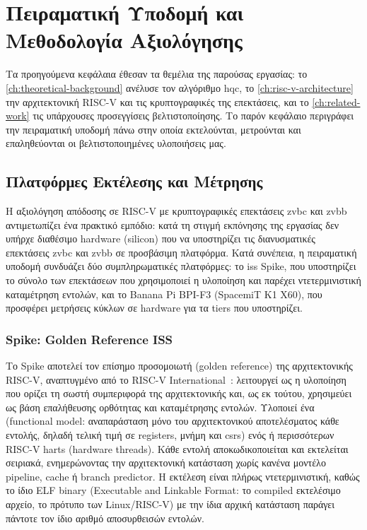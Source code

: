 \chapter{Πειραματική Υποδομή και Μεθοδολογία Αξιολόγησης}
\label{ch:experimental-setup}

Τα προηγούμενα κεφάλαια έθεσαν τα θεμέλια της παρούσας εργασίας: το
\cref{ch:theoretical-background} ανέλυσε τον αλγόριθμο \gls{hqc}, το
\cref{ch:risc-v-architecture} την αρχιτεκτονική RISC-V και τις κρυπτογραφικές
της επεκτάσεις, και το \cref{ch:related-work} τις υπάρχουσες προσεγγίσεις
βελτιστοποίησης. Το παρόν κεφάλαιο περιγράφει την πειραματική υποδομή πάνω στην
οποία εκτελούνται, μετρούνται και επαληθεύονται οι βελτιστοποιημένες υλοποιήσεις μας.

\section{Πλατφόρμες Εκτέλεσης και Μέτρησης}
\label{sec:emulators}

Η αξιολόγηση απόδοσης σε RISC-V με κρυπτογραφικές επεκτάσεις \gls{zvbc} και \gls{zvbb}
αντιμετωπίζει ένα πρακτικό εμπόδιο: κατά τη στιγμή εκπόνησης της εργασίας δεν
υπήρχε διαθέσιμο  hardware (silicon) που να υποστηρίζει τις διανυσματικές
επεκτάσεις \gls{zvbc} και \gls{zvbb} σε προσβάσιμη πλατφόρμα. Κατά συνέπεια, η πειραματική
υποδομή συνδυάζει δύο συμπληρωματικές πλατφόρμες: το \gls{iss} Spike, που
υποστηρίζει το σύνολο των επεκτάσεων που χρησιμοποιεί η υλοποίηση και παρέχει
ντετερμινιστική καταμέτρηση εντολών, και το Banana Pi BPI-F3 (SpacemiT K1 X60),
που προσφέρει μετρήσεις κύκλων σε hardware για τα tiers που υποστηρίζει.

\subsection{Spike: Golden Reference ISS}
\label{ssec:spike}

Το Spike αποτελεί τον επίσημο προσομοιωτή (golden reference) της
αρχιτεκτονικής RISC-V, αναπτυγμένο από το RISC-V International~\cite{spike-github}:
λειτουργεί ως η υλοποίηση που ορίζει τη σωστή συμπεριφορά της αρχιτεκτονικής
και, ως εκ τούτου, χρησιμεύει ως βάση επαλήθευσης ορθότητας
και καταμέτρησης εντολών. Υλοποιεί ένα
 (functional model: αναπαράσταση μόνο του αρχιτεκτονικού
αποτελέσματος κάθε εντολής, δηλαδή τελική τιμή σε registers, μνήμη και \glspl{csr})
ενός ή περισσότερων RISC-V harts (hardware threads). Κάθε εντολή αποκωδικοποιείται και
εκτελείται σειριακά, ενημερώνοντας την αρχιτεκτονική κατάσταση χωρίς κανένα
μοντέλο pipeline, cache ή branch predictor. 
Η εκτέλεση είναι πλήρως ντετερμινιστική, καθώς το ίδιο ELF binary 
(Executable and Linkable Format: το compiled εκτελέσιμο αρχείο, το 
πρότυπο των Linux/RISC-V) με την ίδια αρχική κατάσταση παράγει
πάντοτε τον ίδιο αριθμό αποσυρθεισών εντολών.

